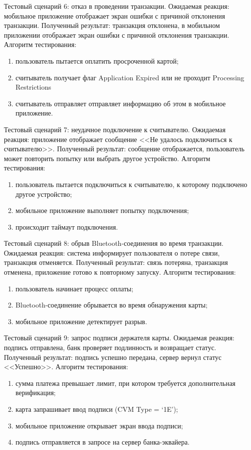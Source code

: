 Тестовый сценарий 6: отказ в проведении транзакции.
Ожидаемая реакция: мобильное приложение отображает экран ошибки с причиной отклонения транзакции.
Полученный результат: транзакция отклонена, в мобильном приложении отображает экран ошибки с причиной отклонения транзакции.
Алгоритм тестирования:
\begin{enumerate}
	\item пользователь пытается оплатить просроченной картой;
	\item считыватель получает флаг Application Expired или не проходит Processing Restrictions
	\item считыватель отправляет отправляет информацию об этом в мобильное приложение.
\end{enumerate}

Тестовый сценарий 7: неудачное подключение к считывателю.
Ожидаемая реакция: приложение отображает сообщение <<Не удалось подключиться к считывателю>>.
Полученный результат: сообщение отображается, пользователь может повторить попытку или выбрать другое устройство.
Алгоритм тестирования:
\begin{enumerate}
	\item пользователь пытается подключиться к считывателю, к которому подключено другое устройство;
	\item мобильное приложение выполняет попытку подключения;
	\item происходит таймаут подключения.
\end{enumerate}

Тестовый сценарий 8: обрыв Bluetooth-соединения во время транзакции.
Ожидаемая реакция: система информирует пользователя о потере связи, транзакция отменяется.
Полученный результат: связь потеряна, транзакция отменена, приложение готово к повторному запуску.
Алгоритм тестирования:
\begin{enumerate}
	\item пользователь начинает процесс оплаты;
	\item Bluetooth-соединение обрывается во время обнаружения карты;
	\item мобильное приложение детектирует разрыв.
\end{enumerate}

Тестовый сценарий 9: запрос подписи держателя карты.
Ожидаемая реакция: подпись отправлена, банк проверяет подлинность и возвращает статус.
Полученный результат: подпись успешно передана, сервер вернул статус <<Успешно>>.
Алгоритм тестирования:
\begin{enumerate}
	\item сумма платежа превышает лимит, при котором требуется дополнительная верификация;
	\item карта запрашивает ввод подписи (CVM Type = ‘1E’);
	\item мобильное приложение открывает экран ввода подписи;
	\item подпись отправляется в запросе на сервер банка-эквайера.
\end{enumerate}

